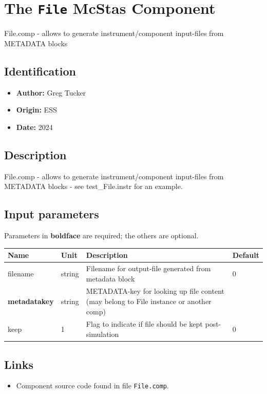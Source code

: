 \section{The \texttt{File} McStas Component}
File.comp - allows to generate instrument/component input-files
from METADATA blocks

\subsection*{Identification}
\begin{itemize}
  \item \textbf{Author:} Greg Tucker
  \item \textbf{Origin:} ESS
  \item \textbf{Date:} 2024
\end{itemize}

\subsection*{Description}
File.comp - allows to generate instrument/component input-files from METADATA blocks - see test\_File.instr for an example.

\subsection*{Input parameters}
Parameters in \textbf{boldface} are required; the others are optional.

\begin{longtable}{p{}p{}p{}p{}}
\toprule
\textbf{Name} & \textbf{Unit} & \textbf{Description} & \textbf{Default} \\
\midrule
\endhead
filename & string & Filename for output-file generated from metadata block & 0 \\
\textbf{metadatakey} & string & METADATA-key for looking up file content (may belong to File instance or another comp) &  \\
keep & 1 & Flag to indicate if file should be kept post-simulation & 0 \\
\bottomrule
\end{longtable}

\subsection*{Links}
\begin{itemize}
  \item Component source code found in file \texttt{File.comp}.
\end{itemize}
